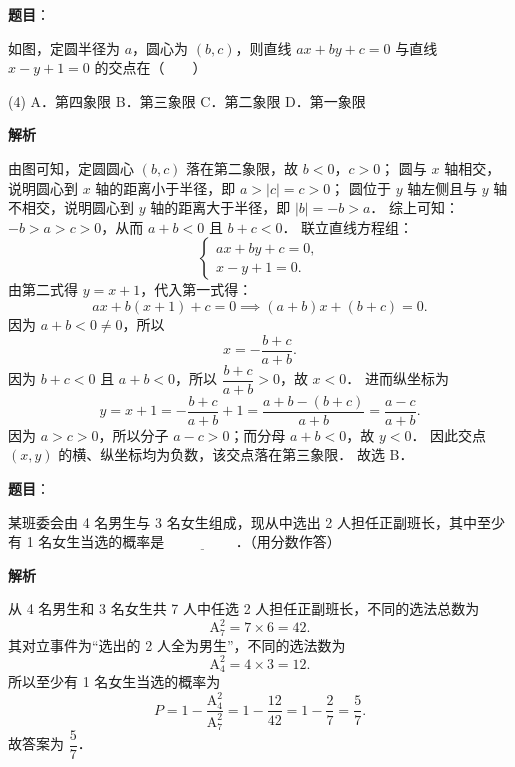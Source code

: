 \begin{answer}

\textbf{题目}：

如图，定圆半径为 $a$，圆心为 $(b, c)$，则直线 $ax + by + c = 0$ 与直线 $x - y + 1 = 0$ 的交点在\mbox{（　　）}
\nopagebreak[4]
\begin{center}\end{center}
\nopagebreak[4]
\begin{gkopts}(4)
\task A．第四象限
\task B．第三象限
\task C．第二象限
\task D．第一象限
\end{gkopts}

\textbf{解析}
\nopagebreak[4]
\begin{center}\end{center}
\nopagebreak[4]
由图可知，定圆圆心 $(b, c)$ 落在第二象限，故 $b < 0$，$c > 0$；
圆与 $x$ 轴相交，说明圆心到 $x$ 轴的距离小于半径，即 $a > |c| = c > 0$；
圆位于 $y$ 轴左侧且与 $y$ 轴不相交，说明圆心到 $y$ 轴的距离大于半径，即 $|b| = -b > a$．
综上可知：$-b > a > c > 0$，从而 $a + b < 0$ 且 $b + c < 0$．
联立直线方程组：
\nopagebreak[4]
\[
\begin{cases}
ax + by + c = 0, \\
x - y + 1 = 0.
\end{cases}
\]
由第二式得 $y = x + 1$，代入第一式得：
\nopagebreak[4]
\[
ax + b(x + 1) + c = 0 \implies (a + b)x + (b + c) = 0.
\]
因为 $a + b < 0 \neq 0$，所以
\nopagebreak[4]
\[
x = -\dfrac{b + c}{a + b}.
\]
因为 $b + c < 0$ 且 $a + b < 0$，所以 $\dfrac{b + c}{a + b} > 0$，故 $x < 0$．
进而纵坐标为
\nopagebreak[4]
\[
y = x + 1 = -\dfrac{b + c}{a + b} + 1 = \dfrac{a + b - (b + c)}{a + b} = \dfrac{a - c}{a + b}.
\]
因为 $a > c > 0$，所以分子 $a - c > 0$；而分母 $a + b < 0$，故 $y < 0$．
因此交点 $(x, y)$ 的横、纵坐标均为负数，该交点落在第三象限．
故选 B．


\end{answer}
\begin{answer}

\textbf{题目}：

某班委会由 4 名男生与 3 名女生组成，现从中选出 2 人担任正副班长，其中至少有 1 名女生当选的概率是 $\underline{\hspace{2cm}}$．（用分数作答）

\textbf{解析}

从 4 名男生和 3 名女生共 7 人中任选 2 人担任正副班长，不同的选法总数为
\nopagebreak[4]
\[
\mathrm{A}_7^2 = 7 \times 6 = 42.
\]
其对立事件为“选出的 2 人全为男生”，不同的选法数为
\nopagebreak[4]
\[
\mathrm{A}_4^2 = 4 \times 3 = 12.
\]
所以至少有 1 名女生当选的概率为
\nopagebreak[4]
\[
P = 1 - \dfrac{\mathrm{A}_4^2}{\mathrm{A}_7^2} = 1 - \dfrac{12}{42} = 1 - \dfrac{2}{7} = \dfrac{5}{7}.
\]
故答案为 $\dfrac{5}{7}$．


\end{answer}

